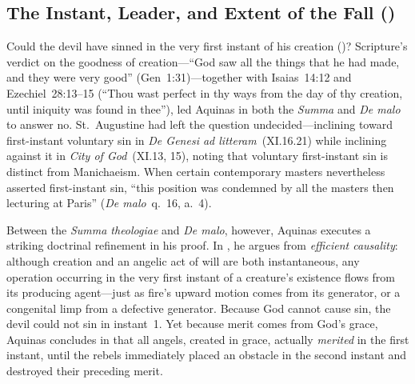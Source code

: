 \subsection{The Instant, Leader, and Extent of the Fall ()}

Could the devil have sinned in the very first instant of his creation ()? Scripture's verdict on the goodness of creation---``God saw all the things that he had made, and they were very good'' (Gen~1:31)---together with Isaias~14:12 and Ezechiel~28:13--15 (``Thou wast perfect in thy ways from the day of thy creation, until iniquity was found in thee''), led Aquinas in both the \emph{Summa} and \emph{De malo} to answer no. St.~Augustine had left the question undecided---inclining toward first-instant voluntary sin in \emph{De Genesi ad litteram}~(XI.16.21) while inclining against it in \emph{City of God}~(XI.13, 15), noting that voluntary first-instant sin is distinct from Manichaeism. When certain contemporary masters nevertheless asserted first-instant sin, ``this position was condemned by all the masters then lecturing at Paris'' (\emph{De malo}~q.~16, a.~4).

Between the \emph{Summa theologiae} and \emph{De malo}, however, Aquinas executes a striking doctrinal refinement in his proof. In , he argues from \emph{efficient causality}: although creation and an angelic act of will are both instantaneous, any operation occurring in the very first instant of a creature's existence flows from its producing agent---just as fire's upward motion comes from its generator, or a congenital limp from a defective generator. Because God cannot cause sin, the devil could not sin in instant~1. Yet because merit comes from God's grace, Aquinas concludes in  that all angels, created in grace, actually \emph{merited} in the first instant, until the rebels immediately placed an obstacle in the second instant and destroyed their preceding merit.

